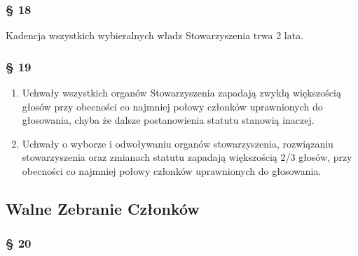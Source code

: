 \documentclass{article}
\newcommand{\myparagraph}[1]{\subsubsection*{#1}}
\begin{document}
\myparagraph{§ 18}
Kadencja wszystkich wybieralnych władz Stowarzyszenia trwa 2 lata.

\myparagraph{§ 19}
\begin{enumerate}
\item
  Uchwały wszystkich organów Stowarzyszenia zapadają zwykłą większością głosów przy obecności co najmniej połowy członków uprawnionych do głosowania, chyba że dalsze postanowienia statutu stanowią inaczej.
\item
  Uchwały o wyborze i odwoływaniu organów stowarzyszenia, rozwiązaniu stowarzyszenia oraz zmianach statutu zapadają większością 2/3 głosów, przy obecności co najmniej połowy członków uprawnionych do głosowania.
\end{enumerate}

\subsection*{Walne Zebranie Członków}
\myparagraph{§ 20}
\end{document}
